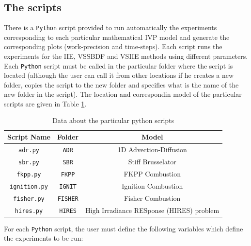 \documentclass[preprint,1p]{article}
\begin{document}
\subsection	{The scripts}	
There is a \texttt{Python} script provided to run automatically the experiments corresponding to each particular mathematical IVP model 
and generate the corresponding plots (work-precision and time-steps).
Each script runs the experiments for the IIE, VSSBDF and VSIIE  methods using different parameters. Each \texttt{Python} script must be called 
in the particular folder where the script is located (although the user can call it from other locations if he creates a new folder, copies the script 
to the new folder and specifies what is the name of the new folder in the script). The location and correspondin model of the particular scripts 
are given in Table \ref{Scripts_table}.



\begin{table}[h!]
	\caption{Data about the particular python scripts}{\label{Scripts_table}}
	\centering 
			\begin{tabular}{|c|c|c|}
			\hline
			{\bf Script Name}       & {\bf Folder}       & {\bf Model   } \\ \hline
			{\tt adr.py}      & {\tt ADR}    & 1D Advection-Diffusion \\ \hline
			{\tt sbr.py}      & {\tt SBR}    & Stiff Brusselator \\ \hline
			{\tt fkpp.py}     & {\tt FKPP}   & FKPP Combustion \\ \hline
			{\tt ignition.py} & {\tt IGNIT}  & Ignition Combustion \\ \hline
			{\tt fisher.py}   & {\tt FISHER} & Fisher Combustion \\ \hline
			{\tt hires.py}   & {\tt HIRES}   & High Irradiance RESponse (HIRES) problem \\ \hline
		\end{tabular}
\end{table}


For each \texttt{Python} script, the user must define the following variables 
which define the experiments to be run:
\end{document}
